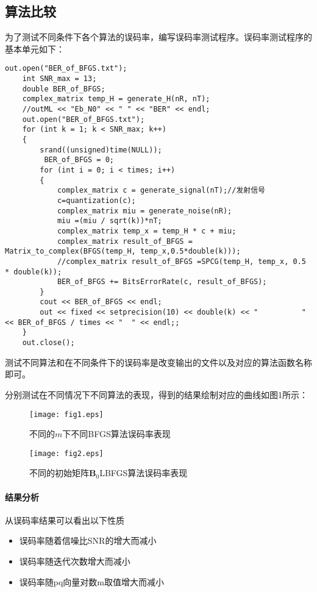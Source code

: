 \documentclass[twocolumn]{ctexart}
\begin{document}
\subsection{算法比较}
\par 为了测试不同条件下各个算法的误码率，编写误码率测试程序。误码率测试程序的基本单元如下：
\begin{lstlisting}
out.open("BER_of_BFGS.txt");
	int SNR_max = 13;
	double BER_of_BFGS;
	complex_matrix temp_H = generate_H(nR, nT);
	//outML << "Eb_N0" << "	" << "BER" << endl;
	out.open("BER_of_BFGS.txt");
	for (int k = 1; k < SNR_max; k++)
	{
		srand((unsigned)time(NULL));
		 BER_of_BFGS = 0;
		for (int i = 0; i < times; i++)
		{
			complex_matrix c = generate_signal(nT);//发射信号
			c=quantization(c);
			complex_matrix miu = generate_noise(nR);
			miu =(miu / sqrt(k))*nT;
			complex_matrix temp_x = temp_H * c + miu;
			complex_matrix result_of_BFGS = Matrix_to_complex(BFGS(temp_H, temp_x,0.5*double(k)));
			//complex_matrix result_of_BFGS =SPCG(temp_H, temp_x, 0.5 * double(k));
			BER_of_BFGS += BitsErrorRate(c, result_of_BFGS);
		}
		cout << BER_of_BFGS << endl;
		out << fixed << setprecision(10) << double(k) << "			" << BER_of_BFGS / times << "  " << endl;;
	}
	out.close();
\end{lstlisting}
测试不同算法和在不同条件下的误码率是改变输出的文件以及对应的算法函数名称即可。
\par 分别测试在不同情况下不同算法的表现，得到的结果绘制对应的曲线如图1所示：
\begin{figure*}[htbp]

\begin{minipage}[t]{0.48\textwidth}
\centering
\texttt{[image: fig1.eps]}
\caption{不同的$ m$下不同BFGS算法误码率表现}
\end{minipage}
\centering
\begin{minipage}[t]{0.48\textwidth}
\centering
\texttt{[image: fig2.eps]}
\caption{不同的初始矩阵$ \mathbf{B}_0 $LBFGS算法误码率表现}
\end{minipage}
\end{figure*}
\paragraph{结果分析} 从误码率结果可以看出以下性质
\begin{itemize}
\item 误码率随着信噪比SNR的增大而减小
\item 误码率随迭代次数增大而减小
\item 误码率随pq向量对数m取值增大而减小
\end{itemize}
\end{document}
